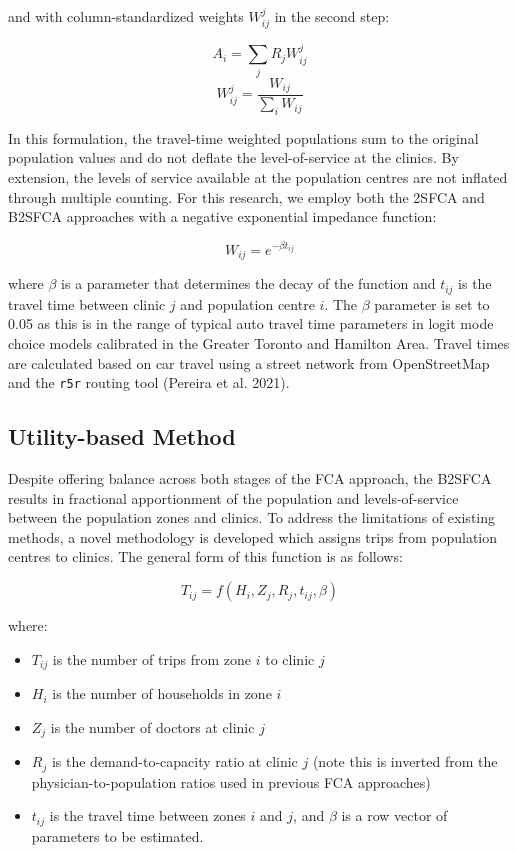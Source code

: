 \documentclass{article}
\begin{document}
and with column-standardized weights \(W_{ij}^{j}\) in the second step:

\[
A_i = \sum_j{R_jW_{ij}^{j}}
\] \[
W_{ij}^{j} = \frac{W_{ij}}{\sum_i W_{ij}}
\]

In this formulation, the travel-time weighted populations sum to the
original population values and do not deflate the level-of-service at
the clinics. By extension, the levels of service available at the
population centres are not inflated through multiple counting. For this
research, we employ both the 2SFCA and B2SFCA approaches with a negative
exponential impedance function:

\[
W_{ij} = e^{-\beta t_{ij}}
\]

where \(\beta\) is a parameter that determines the decay of the function
and \(t_{ij}\) is the travel time between clinic \(j\) and population
centre \(i\). The \(\beta\) parameter is set to 0.05 as this is in the
range of typical auto travel time parameters in logit mode choice models
calibrated in the Greater Toronto and Hamilton Area. Travel times are
calculated based on car travel using a street network from OpenStreetMap
and the \texttt{r5r} routing tool (Pereira et al. 2021).

\hypertarget{utility-based-method}{%
\subsection{Utility-based Method}\label{utility-based-method}}

Despite offering balance across both stages of the FCA approach, the
B2SFCA results in fractional apportionment of the population and
levels-of-service between the population zones and clinics. To address
the limitations of existing methods, a novel methodology is developed
which assigns trips from population centres to clinics. The general form
of this function is as follows:

\[
T_{ij} = f(H_i, Z_j, R_j, t_{ij}, \beta)
\]

where:

\begin{itemize}
\item
  \(T_{ij}\) is the number of trips from zone \(i\) to clinic \(j\)
\item
  \(H_i\) is the number of households in zone \(i\)
\item
  \(Z_j\) is the number of doctors at clinic \(j\)
\item
  \(R_j\) is the demand-to-capacity ratio at clinic \(j\) (note this is
  inverted from the physician-to-population ratios used in previous FCA
  approaches)
\item
  \(t_{ij}\) is the travel time between zones \(i\) and \(j\), and
  \(\beta\) is a row vector of parameters to be estimated.
\end{itemize}
\end{document}
